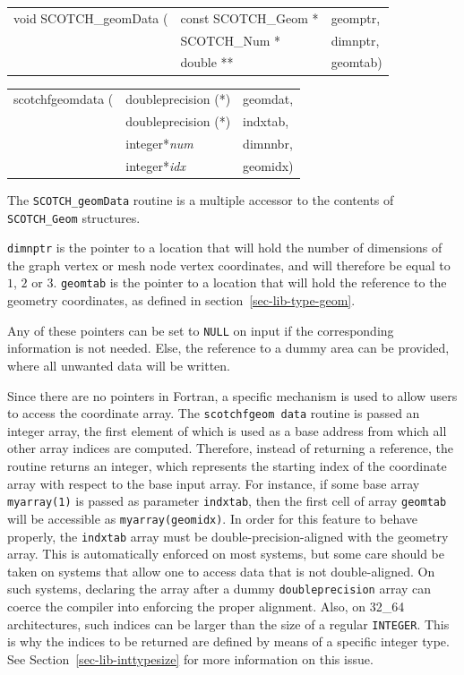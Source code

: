 \begin{itemize}
\progsyn

{\tt\begin{tabular}{l@{}ll}
void SCOTCH\_geomData ( & const SCOTCH\_Geom * & geomptr, \\
                        & SCOTCH\_Num *        & dimnptr, \\
                        & double **            & geomtab)
\end{tabular}}

{\tt\begin{tabular}{l@{}ll}
scotchfgeomdata ( & doubleprecision (*) & geomdat, \\
                  & doubleprecision (*) & indxtab, \\
                  & integer*{\it num}   & dimnnbr, \\
                  & integer*{\it idx}   & geomidx)
\end{tabular}}

\progdes

The {\tt SCOTCH\_geomData} routine is a multiple
accessor to the contents of {\tt SCOTCH\_Geom} structures.

{\tt dimnptr} is the pointer to a location that will hold the
number of dimensions of the graph vertex or mesh node vertex
coordinates, and will therefore be equal to $1$, $2$ or $3$.
{\tt geomtab} is the pointer to a location that will hold the
reference to the geometry coordinates, as defined in
section~\ref{sec-lib-type-geom}.

Any of these pointers can be set to {\tt NULL} on input if the
corresponding information is not needed. Else, the reference to a
dummy area can be provided, where all unwanted data will be written.

Since there are no pointers in Fortran, a specific mechanism is used
to allow users to access the coordinate array. The {\tt scotchf\lbt geom\lbt
data} routine is passed an integer array, the first element of which is used
as a base address from which all other array indices are
computed. Therefore, instead of returning a reference, the routine
returns an integer, which represents the starting index of the coordinate
array with respect to the base input array. For
instance, if some base array {\tt myarray\lbt (1)} is passed as
parameter {\tt indxtab}, then the first cell of array {\tt geomtab}
will be accessible as {\tt myarray\lbt (geomidx)}.
In order for this feature to behave properly, the {\tt indxtab}
array must be double-precision-aligned with the geometry array. This is
automatically enforced on most systems, but some care should be
taken on systems that allow one to access data that is not
double-aligned. On such systems, declaring the array after a
dummy {\tt double\lbt precision} array can coerce the compiler
into enforcing the proper alignment. Also, on 32\_64 architectures,
such indices can be larger than the size of a regular
{\tt INTEGER}. This is why the indices to be returned are defined by
means of a specific integer type. See
Section~\ref{sec-lib-inttypesize} for more information on this
issue.
\end{itemize}

